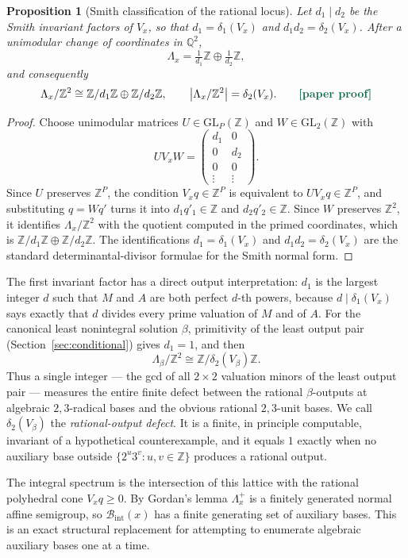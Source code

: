 \documentclass[11pt,oneside]{article}
\newtheorem{proposition}[theorem]{Proposition}
\theoremstyle{definition}
\theoremstyle{remark}
\newcommand{\Z}{\mathbb Z}
\newcommand{\Q}{\mathbb Q}
\newcommand{\statusnew}{\textcolor{newgreen}{\textbf{[paper proof]}}}
\begin{document}
\begin{proposition}[Smith classification of the rational locus]
\label{vl:prop-smith}
Let $d_1\mid d_2$ be the Smith invariant factors of $V_x$, so that $d_1=\delta_1(V_x)$ and
$d_1d_2=\delta_2(V_x)$.  After a unimodular change of coordinates in $\Q^2$,
\[
  \Lambda_x=\tfrac1{d_1}\Z\oplus\tfrac1{d_2}\Z ,
\]
and consequently
\[
  \Lambda_x/\Z^2\cong\Z/d_1\Z\oplus\Z/d_2\Z,
  \qquad
  \bigl|\Lambda_x/\Z^2\bigr|=\delta_2(V_x).
  \qquad\statusnew
\]
\end{proposition}

\begin{proof}
Choose unimodular matrices $U\in\mathrm{GL}_P(\Z)$ and $W\in\mathrm{GL}_2(\Z)$ with
\[
 UV_xW=\begin{pmatrix}d_1&0\\0&d_2\\0&0\\\vdots&\vdots\end{pmatrix}.
\]
Since $U$ preserves $\Z^{P}$, the condition $V_xq\in\Z^{P}$ is equivalent to
$UV_xq\in\Z^{P}$, and substituting $q=Wq'$ turns it into $d_1q'_1\in\Z$ and $d_2q'_2\in\Z$.
Since $W$ preserves $\Z^2$, it identifies $\Lambda_x/\Z^2$ with the quotient computed in the
primed coordinates, which is $\Z/d_1\Z\oplus\Z/d_2\Z$.  The identifications
$d_1=\delta_1(V_x)$ and $d_1d_2=\delta_2(V_x)$ are the standard determinantal-divisor
formulae for the Smith normal form.
\end{proof}

The first invariant factor has a direct output interpretation: $d_1$ is the largest integer
$d$ such that $M$ and $A$ are both perfect $d$-th powers, because $d\mid\delta_1(V_x)$ says
exactly that $d$ divides every prime valuation of $M$ and of $A$.  For the canonical least
nonintegral solution $\beta$, primitivity of the least output pair (Section~\ref{sec:conditional})
gives $d_1=1$, and then
\[
  \Lambda_\beta/\Z^2\cong\Z/\delta_2(V_\beta)\Z .
\]
Thus a single integer --- the gcd of all $2\times2$ valuation minors of the least output pair
--- measures the entire finite defect between the rational $\beta$-outputs at algebraic
$2,3$-radical bases and the obvious rational $2,3$-unit bases.  We call $\delta_2(V_\beta)$
the \emph{rational-output defect}.  It is a finite, in principle computable, invariant of a
hypothetical counterexample, and it equals $1$ exactly when no auxiliary base outside
$\{2^u3^v:u,v\in\Z\}$ produces a rational output.

The integral spectrum is the intersection of this lattice with the rational polyhedral cone
$V_xq\ge0$.  By Gordan's lemma $\Lambda_x^{+}$ is a finitely generated normal affine
semigroup, so $\mathcal B_{\mathrm{int}}(x)$ has a finite generating set of auxiliary bases.
This is an exact structural replacement for attempting to enumerate algebraic auxiliary bases
one at a time.
\end{document}
